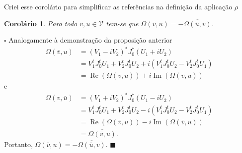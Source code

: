 \documentclass[12pt]{book}
\newtheorem{corolario}[teorema]{Corolário}
\newenvironment{prova}[1]{$\square$ #1}{\hfill$\blacksquare$}
\DeclareMathOperator{\Ima}{Im}
\DeclareMathOperator{\re}{Re}
\newcommand{\complexificado}[1]{\mathcal{#1}}
\newcommand{\estruturacomplexa}{J_{0}}
\newcommand{\formaSimpleticaExtendida}[2]{\Omega(#1, #2)}
\newcommand{\parteImaginaria}[1]{\Ima{(#1)}}
\newcommand{\parteReal}[1]{\re (#1)}
\newcommand{\alerta}[1]{{\color{red}#1}}
\begin{document}
	
	\alerta{Criei esse corolário para simplificar as referências na definição da aplicação $\rho$}
	\begin{corolario}\label{corolario_simetria_forma_simpletica}
		Para todo $v,u \in \complexificado{V}$ tem-se que $\Omega(\bar{v}, u)=-\overline{\formaSimpleticaExtendida{\bar{u}}{v}}$.
	\end{corolario}
	\begin{prova}
		Analogamente à demonstração da proposição anterior
		$$
			\begin{aligned}
				\formaSimpleticaExtendida{\bar{v}}{u}&= (V_{1}-iV_{2})^{*}\estruturacomplexa^{*} (U_{1}+iU_{2})
				\\
				&= V_{1}^{t}\estruturacomplexa^{t} U_{1} +V_{2}^{t}\estruturacomplexa^{t} U_{2}+i( V_{1}^{t}\estruturacomplexa^{t} U_{2} - V_{2}^{t}\estruturacomplexa^{t} U_{1})
				\\
				&=\parteReal{\formaSimpleticaExtendida{\bar{v}}{u}} +i\parteImaginaria{\formaSimpleticaExtendida{\bar{v}}{u}}
			\end{aligned}
		$$
		e
		$$
		\begin{aligned}
		\formaSimpleticaExtendida{v}{\bar{u}}
		&= (V_{1}+iV_{2})^{*}\estruturacomplexa^{*} (U_{1}-iU_{2})
		\\
		&= V_{1}^{t}\estruturacomplexa^{t} U_{1} +V_{2}^{t}\estruturacomplexa^{t} U_{2}-i( V_{1}^{t}\estruturacomplexa^{t} U_{2} - V_{2}^{t}\estruturacomplexa^{t} U_{1})
		\\
		&=\parteReal{\formaSimpleticaExtendida{\bar{v}}{u}} -i\parteImaginaria{\formaSimpleticaExtendida{\bar{v}}{u}}
		\\
		&=\overline{\formaSimpleticaExtendida{\bar{v}}{u}}.
		\end{aligned}
		$$
		Portanto, $\formaSimpleticaExtendida{\bar{v}}{u}=-\overline{\formaSimpleticaExtendida{\bar{u}}{v}}$.
	\end{prova}
	
\end{document}
